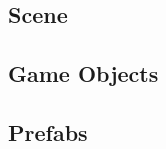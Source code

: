 
\subsection{Scene}

\subsection{Game Objects}

\subsection{Prefabs}


\subsection{}

\subsection{}

\subsection{}